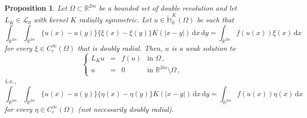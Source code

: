 \documentclass[12pt,reqno]{amsart}
\newtheorem{proposition}[theorem]{Proposition}
\theoremstyle{definition}
\theoremstyle{remark}
\newcommand{\con}[1]{\mathbb{#1}}
\newcommand{\R}{\con{R}} %
\renewcommand{\H}{\con{H}}
\newcommand{\lcal}{\mathcal{L}}
\renewcommand{\d}{\,\mathrm{d}} %
\newcommand\beqc[1]{\left\{\begin{array}{#1}}
\newcommand\eeqc{\end{array} \right.}
\def\PDEsystem{rcll}
\numberwithin{equation}{section}
\begin{document}
\begin{proposition}
	\label{Prop:WeakSolutionForAllTestFunctions}
	Let $\Omega \subset \R^{2m}$ be a bounded set of double revolution and let $L_K \in \lcal_0$ with kernel $K$ radially symmetric. Let $u\in \widetilde{\H}^K_{0}(\Omega)$ be such that
	$$
	\int_{\R^{2m}}\int_{\R^{2m}} \{u(x)-u(y)\}\{\xi(x)-\xi(y)\} K(|x-y|) \d x \d y = \int_{\R^{2m}} f(u(x)) \xi(x) \d x
	$$
	for every $\xi \in C^\infty_c(\Omega)$ that is doubly radial. Then, $u$ is a weak solution to
	$$
	\beqc{\PDEsystem}
	L_K u &=& f(u) & \text{in } \Omega\,,\\
	u &=& 0 & \text{in } \R^{2m}\setminus \Omega\,,
	\eeqc
	$$
	i.e.,
	$$
	\int_{\R^{2m}}\int_{\R^{2m}} \{u(x)-u(y)\}\{\eta(x)-\eta(y)\} K(|x-y|) \d x \d y = \int_{\R^{2m}} f(u(x)) \eta(x) \d x
	$$
	for every $\eta \in C^\infty_c(\Omega)$ (not necessarily doubly radial).
\end{proposition}
\end{document}
